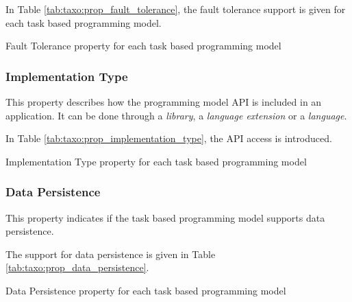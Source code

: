 In Table \ref{tab:taxo:prop_fault_tolerance}, the fault tolerance support is given for each task based programming model.
\begin{table}[H]
	\caption{Fault Tolerance property for each task based programming model \label{tab:taxo:prop_fault_tolerance}}
	\centering
	\begin{multicols}{2}
		

		
	\end{multicols}
\end{table}

\subsubsection{Implementation Type}
This property describes how the programming model API is included in an application.
It can be done through a \textit{library}, a \textit{language extension} or a \textit{language}.

In Table \ref{tab:taxo:prop_implementation_type}, the API access is introduced.
\begin{table}[H]
	\caption{Implementation Type property for each task based programming model \label{tab:taxo:prop_implementation_type}}
	\centering
	\begin{multicols}{2}
		

		
	\end{multicols}
\end{table}

\subsubsection{Data Persistence}
This property indicates if the task based programming model supports data persistence.

The support for data persistence is given in Table \ref{tab:taxo:prop_data_persistence}.
\begin{table}[H]
	\caption{Data Persistence property for each task based programming model \label{tab:taxo:prop_data_persistence}}
	\centering
	\begin{multicols}{2}
		

		
	\end{multicols}
\end{table}

